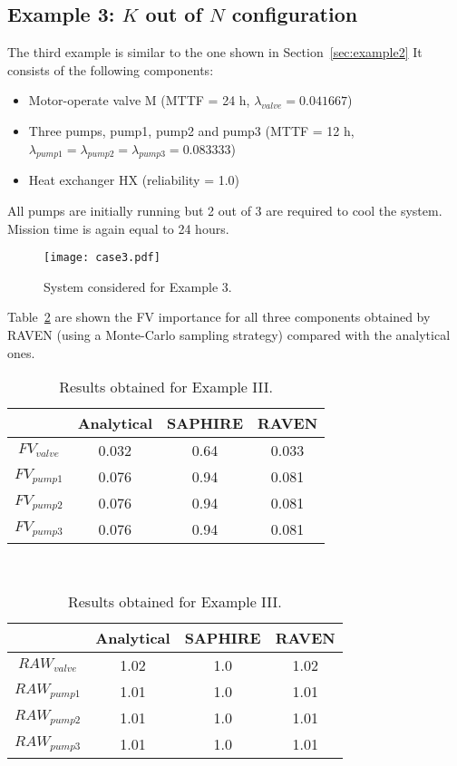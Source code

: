 \subsection{Example 3: $K$ out of $N$ configuration}
\label{sec:example3}

The third example is similar to the one shown in Section~\ref{sec:example2}
It consists of the following components:
\begin{itemize}
  \item Motor-operate valve M (MTTF = 24 h, $\lambda_{valve} = 0.041667$)
  \item Three pumps, pump1, pump2 and pump3 
        (MTTF = 12 h, $\lambda_{pump1} = \lambda_{pump2} = \lambda_{pump3} = 0.083333$)
  \item Heat exchanger HX (reliability = 1.0)
\end{itemize}
All pumps are initially running but 2 out of 3 are required to cool the system.
Mission time is again equal to 24 hours.

\begin{figure}
    \centering
    \centerline{\texttt{[image: case3.pdf]}}
    \caption{System considered for Example 3.}
    \label{fig:example4}
\end{figure}

Table~\ref{tab:example3} are shown the FV importance for all three components obtained by RAVEN (using a Monte-Carlo 
sampling strategy) compared with the analytical ones.

\begin{table}
    \caption{Results obtained for Example III.}
    \begin{minipage}{.5\linewidth}
      \centering
      \begin{tabular}{c | c | c | c} 
        \hline 
         & Analytical & SAPHIRE & RAVEN \\ 
        \hline 
        $FV_{valve}$ & 0.032 & 0.64 & 0.033  \\
        $FV_{pump1}$ & 0.076 & 0.94 & 0.081  \\
        $FV_{pump2}$ & 0.076 & 0.94 & 0.081  \\
        $FV_{pump3}$ & 0.076 & 0.94 & 0.081  \\ 
        \hline 
      \end{tabular}
    \end{minipage} \\
    \begin{minipage}{.5\linewidth}
      \centering
      \begin{tabular}{c | c | c | c} 
        \hline 
         & Analytical & SAPHIRE & RAVEN \\ 
        \hline 
        $RAW_{valve}$ & 1.02 & 1.0 & 1.02  \\
        $RAW_{pump1}$ & 1.01 & 1.0 & 1.01  \\
        $RAW_{pump2}$ & 1.01 & 1.0 & 1.01  \\
        $RAW_{pump3}$ & 1.01 & 1.0 & 1.01  \\ 
        \hline 
      \end{tabular}
    \end{minipage} 
    \label{tab:example3}
\end{table}


